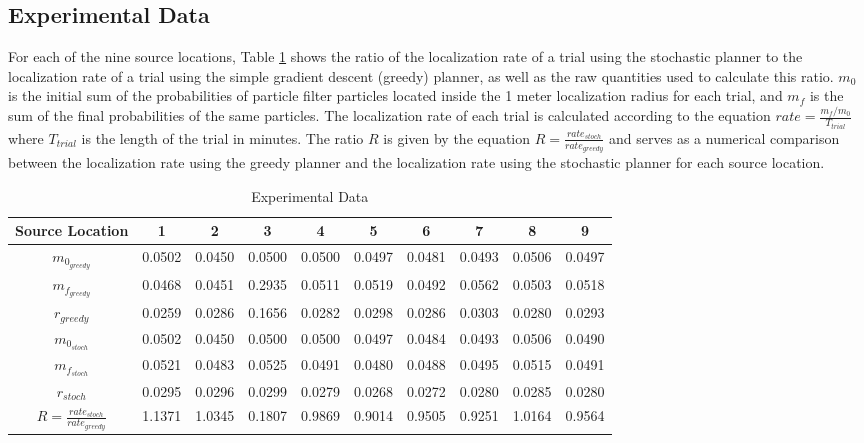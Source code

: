 \documentclass[submit, 12pt]{aiaa-pretty-modified}
\begin{document}
\subsection{Experimental Data}
For each of the nine source locations, Table \ref{tab:data} shows the
ratio of the localization rate of
a trial using the stochastic planner to the localization rate of
a trial using the simple gradient descent (greedy) planner, as well as
the raw quantities used to calculate this ratio. $m_0$ is the initial sum of
the probabilities of particle filter particles located inside the 1
meter localization radius for each trial, and $m_f$ is the sum
of the final probabilities of the same particles. The localization rate of
each trial is calculated according to the equation $rate =
\frac{m_f/m_0}{T_{trial}}$ where $T_{trial}$ is the length of the
trial in minutes.  The ratio $R$ is given by the equation $R =
\frac{rate_{stoch}}{rate_{greedy}}$ and serves as a numerical
comparison between the localization rate using the greedy planner and
the localization rate using the stochastic planner for each source location.

\begin{table}[htb]
\begin{center}
\begin{tabular}{|c||c||c||c||c||c||c||c||c||c|}
\hline
 Source Location & 1 & 2 & 3 & 4 & 5 & 6 & 7 & 8 & 9 \\
\hline \hline
$m_{0_{greedy}}$ & 0.0502 & 0.0450 & 0.0500 & 0.0500 & 0.0497 & 0.0481 & 0.0493 & 0.0506 & 0.0497 \\
\hline
$m_{f_{greedy}}$ & 0.0468 & 0.0451 & 0.2935 & 0.0511 & 0.0519 & 0.0492 & 0.0562 & 0.0503 & 0.0518 \\
\hline
$r_{greedy}$ & 0.0259 & 0.0286 & 0.1656 & 0.0282 & 0.0298 & 0.0286 & 0.0303 & 0.0280 & 0.0293 \\
\hline
$m_{0_{stoch}}$ & 0.0502 & 0.0450 & 0.0500 & 0.0500 & 0.0497 & 0.0484 & 0.0493 & 0.0506 & 0.0490 \\
\hline
$m_{f_{stoch}}$ & 0.0521 & 0.0483 & 0.0525 & 0.0491 & 0.0480 & 0.0488 & 0.0495 & 0.0515 & 0.0491 \\
\hline
$r_{stoch}$ & 0.0295 & 0.0296 & 0.0299 & 0.0279 & 0.0268 & 0.0272 & 0.0280 & 0.0285 & 0.0280 \\
\hline
\hline
$R = \frac{rate_{stoch}}{rate_{greedy}}$  & 1.1371 & 1.0345 & 0.1807 & 0.9869 &
0.9014 & 0.9505  & 0.9251 & 1.0164 & 0.9564\\
\hline
\end{tabular}
\caption{Experimental Data \label{tab:data} }
\end{center}
\end{table}
\end{document}
